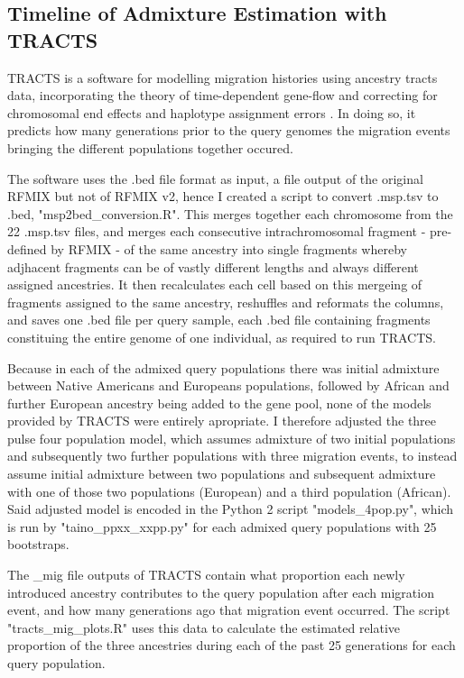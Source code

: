 \documentclass[11pt]{article}
\begin{document}
\subsection{Timeline of Admixture Estimation with TRACTS}

TRACTS is a software for modelling migration histories using ancestry tracts data, incorporating the theory of time-dependent gene-flow and correcting for chromosomal end effects and haplotype assignment errors \parencite{Gravel2012}. In doing so, it predicts how many generations prior to the query genomes the migration events bringing the different populations together occured.

The software uses the .bed file format as input, a file output of the original RFMIX but not of RFMIX v2, hence I created a script to convert .msp.tsv to .bed, "msp2bed\_conversion.R". This merges together each chromosome from the 22 .msp.tsv files, and merges each consecutive intrachromosomal fragment - pre-defined by RFMIX - of the same ancestry into single fragments whereby adjhacent fragments can be of vastly different lengths and always different assigned ancestries. It then recalculates each cell based on this mergeing of fragments assigned to the same ancestry, reshuffles and reformats the columns, and saves one .bed file per query sample, each .bed file containing fragments constituing the entire genome of one individual, as required to run TRACTS.

Because in each of the admixed query populations there was initial admixture between Native Americans and Europeans populations, followed by African and further European ancestry being added to the gene pool, none of the models provided by TRACTS were entirely apropriate. I therefore adjusted the three pulse four population model, which assumes admixture of two initial populations and subsequently two further populations with three migration events, to instead assume initial admixture between two populations and subsequent admixture with one of those two populations (European) and a third population (African). Said adjusted model is encoded in the Python 2 script "models\_4pop.py", which is run by "taino\_ppxx\_xxpp.py" for each admixed query populations with 25 bootstraps.

The \_mig file outputs of TRACTS contain what proportion each newly introduced ancestry contributes to the query population after each migration event, and how many generations ago that migration event occurred. The script "tracts\_mig\_plots.R" uses this data to calculate the estimated relative proportion of the three ancestries during each of the past 25 generations for each query population. 
\end{document}
